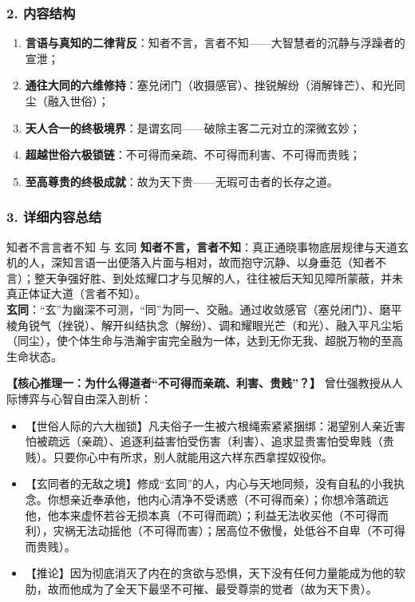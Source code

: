 \subsubsection{2. 内容结构}
\begin{enumerate}
    \item \textbf{言语与真知的二律背反}：知者不言，言者不知——大智慧者的沉静与浮躁者的宣泄；
    \item \textbf{通往大同的六维修持}：塞兑闭门（收摄感官）、挫锐解纷（消解锋芒）、和光同尘（融入世俗）；
    \item \textbf{天人合一的终极境界}：是谓玄同——破除主客二元对立的深微玄妙；
    \item \textbf{超越世俗六极锁链}：不可得而亲疏、不可得而利害、不可得而贵贱；
    \item \textbf{至高尊贵的终极成就}：故为天下贵——无瑕可击者的长存之道。
\end{enumerate}

\subsubsection{3. 详细内容总结}

\begin{ConceptBox}{知者不言言者不知 与 玄同}
\textbf{知者不言，言者不知}：真正通晓事物底层规律与天道玄机的人，深知言语一出便落入片面与相对，故而抱守沉静、以身垂范（知者不言）；整天争强好胜、到处炫耀口才与见解的人，往往被后天知见障所蒙蔽，并未真正体证大道（言者不知）。\\
\textbf{玄同}：“玄”为幽深不可测，“同”为同一、交融。通过收敛感官（塞兑闭门）、磨平棱角锐气（挫锐）、解开纠结执念（解纷）、调和耀眼光芒（和光）、融入平凡尘垢（同尘），使个体生命与浩瀚宇宙完全融为一体，达到无你无我、超脱万物的至高生命状态。
\end{ConceptBox}

\noindent\textbf{【核心推理一：为什么得道者“不可得而亲疏、利害、贵贱”？】}
曾仕强教授从人际博弈与心智自由深入剖析：
\begin{itemize}
    \item 【世俗人际的六大枷锁】凡夫俗子一生被六根绳索紧紧捆绑：渴望别人亲近害怕被疏远（亲疏）、追逐利益害怕受伤害（利害）、追求显贵害怕受卑贱（贵贱）。只要你心中有所求，别人就能用这六样东西拿捏奴役你。
    \item 【玄同者的无敌之境】修成“玄同”的人，内心与天地同频，没有自私的小我执念。你想亲近奉承他，他内心清净不受诱惑（不可得而亲）；你想冷落疏远他，他本来虚怀若谷无损本真（不可得而疏）；利益无法收买他（不可得而利），灾祸无法动摇他（不可得而害）；居高位不傲慢，处低谷不自卑（不可得而贵贱）。
    \item 【推论】因为彻底消灭了内在的贪欲与恐惧，天下没有任何力量能成为他的软肋，故而他成为了全天下最坚不可摧、最受尊崇的觉者（故为天下贵）。
\end{itemize}

